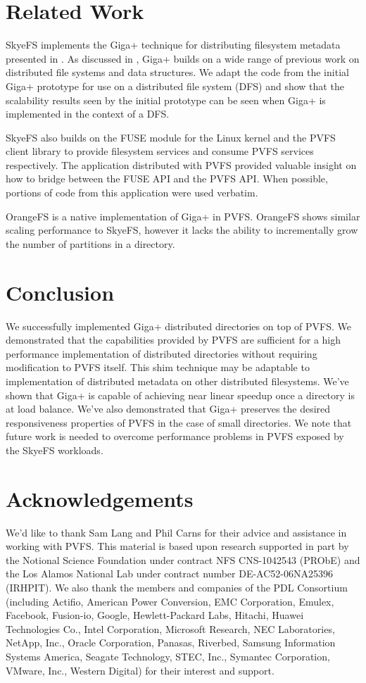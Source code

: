\documentclass[onecolumn, 11pt, letterpaper]{article}
\begin{document}
\section{Related Work}
SkyeFS implements the Giga+ technique for distributing filesystem metadata
presented in \cite{gigaplus}.  As discussed in \cite{gigaplus}, Giga+ builds
on a wide range of previous work on distributed file systems and data
structures.  We adapt the code from the initial Giga+ prototype for use on a
distributed file system (DFS) and show that the scalability results seen by
the initial prototype can be seen when Giga+ is implemented in the context of
a DFS.

SkyeFS also builds on the FUSE module for the Linux kernel and the PVFS client
library to provide filesystem services and consume PVFS services respectively.
The  application distributed with PVFS provided valuable
insight on how to bridge between the FUSE API and the PVFS API.  When
possible, portions of code from this application were used verbatim.

OrangeFS is a native implementation of Giga+ in PVFS.\cite{orange}  OrangeFS
shows similar scaling performance to SkyeFS, however it lacks the ability to
incrementally grow the number of partitions in a directory.

\section{Conclusion}
We successfully implemented Giga+ distributed directories on top of PVFS.  We
demonstrated that the capabilities provided by PVFS are sufficient for a high
performance implementation of distributed directories without requiring
modification to PVFS itself.  This shim technique may be adaptable to
implementation of distributed metadata on other distributed filesystems.
We've shown that Giga+ is capable of achieving near linear speedup once a
directory is at load balance.  We've also demonstrated that Giga+ preserves
the desired responsiveness properties of PVFS in the case of small
directories.  We note that future work is needed to overcome performance
problems in PVFS exposed by the SkyeFS workloads.

\section*{Acknowledgements}
We'd like to thank Sam Lang and Phil Carns for their advice and assistance in
working with PVFS.  This material is based upon research supported in part by
the Notional Science Foundation under contract NFS CNS-1042543 (PRObE) and
the Los Alamos National Lab under contract number DE-AC52-06NA25396 (IRHPIT).
We also thank the members and companies of the PDL Consortium (including
Actifio, American Power Conversion, EMC Corporation, Emulex, Facebook,
Fusion-io, Google, Hewlett-Packard Labs, Hitachi, Huawei Technologies Co.,
Intel Corporation, Microsoft Research, NEC Laboratories, NetApp, Inc., Oracle
Corporation, Panasas, Riverbed, Samsung Information Systems America, Seagate
Technology, STEC, Inc., Symantec Corporation, VMware, Inc., Western Digital)
for their interest and support.
\end{document}
